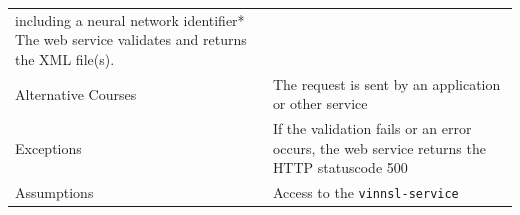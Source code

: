 \begin{longtable}[]{@{}ll@{}}
\begin{minipage}[t]{0.68\columnwidth}
including a neural network identifier* The web service validates and
returns the XML file(s).\strut
\end{minipage}\tabularnewline
\begin{minipage}[t]{0.27\columnwidth}\raggedright\strut
Alternative Courses\strut
\end{minipage} & \begin{minipage}[t]{0.68\columnwidth}\raggedright\strut
The request is sent by an application or other service\strut
\end{minipage}\tabularnewline
\begin{minipage}[t]{0.27\columnwidth}\raggedright\strut
Exceptions\strut
\end{minipage} & \begin{minipage}[t]{0.68\columnwidth}\raggedright\strut
If the validation fails or an error occurs, the web service returns the
HTTP statuscode 500\strut
\end{minipage}\tabularnewline
\begin{minipage}[t]{0.27\columnwidth}\raggedright\strut
Assumptions\strut
\end{minipage} & \begin{minipage}[t]{0.68\columnwidth}\raggedright\strut
Access to the \texttt{vinnsl-service}\strut
\end{minipage}\tabularnewline
\bottomrule
\end{longtable}

